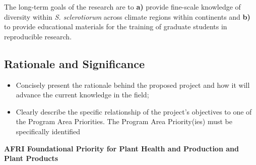 \documentclass[12pt,letterpaper]{article}
\begin{document}
The long-term goals of the research are to \textbf{a)} provide fine-scale knowledge of diversity within \textit{S. sclerotiorum} across climate regions within continents and \textbf{b)} to provide educational materials for the training of graduate students in reproducible research. 

\subsection{Rationale and Significance}

\begin{itemize}
  \item Concisely present the rationale behind the proposed project and how it will
  advance the current knowledge in the field;

  \item Clearly describe the specific relationship of the project's objectives to
  one of the Program Area Priorities. The Program Area Priority(ies) must be
  specifically identified
\end{itemize}


\textbf{AFRI Foundational Priority for Plant Health and Production and Plant Products}
\end{document}

